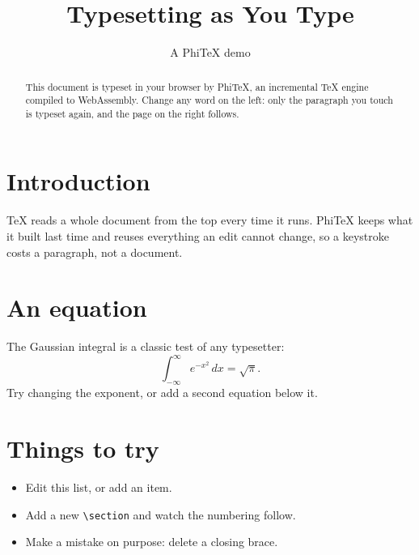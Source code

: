 \documentclass[11pt]{article}
\title{Typesetting as You Type}
\author{A PhiTeX demo}
\date{}
\begin{document}
\maketitle

\begin{abstract}
This document is typeset in your browser by PhiTeX, an incremental TeX
engine compiled to WebAssembly. Change any word on the left: only the
paragraph you touch is typeset again, and the page on the right follows.
\end{abstract}

\section{Introduction}
TeX reads a whole document from the top every time it runs. PhiTeX keeps
what it built last time and reuses everything an edit cannot change, so a
keystroke costs a paragraph, not a document.

\section{An equation}
The Gaussian integral is a classic test of any typesetter:
\begin{equation}
  \int_{-\infty}^{\infty} e^{-x^2}\,dx = \sqrt{\pi}.
\end{equation}
Try changing the exponent, or add a second equation below it.

\section{Things to try}
\begin{itemize}
  \item Edit this list, or add an item.
  \item Add a new \verb|\section| and watch the numbering follow.
  \item Make a mistake on purpose: delete a closing brace.
\end{itemize}
\end{document}
